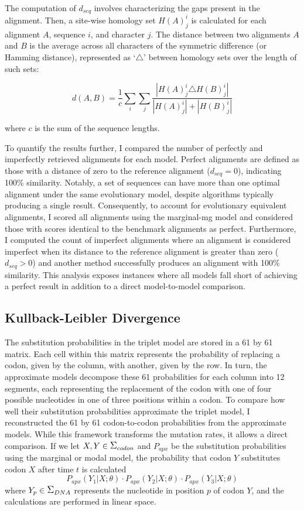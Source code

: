 The computation of $d_{seq}$ involves characterizing the gaps present in the alignment. Then, a site-wise homology set $H(A)^i_j$ is calculated for each alignment $A$, sequence $i$, and character $j$. The distance between two alignments $A$ and $B$ is the average across all characters of the symmetric difference (or Hamming distance), represented as `$\triangle$' between homology sets over the length of such sets:

\begin{equation}
d(A,B) = \frac{1}{c} \sum_i \sum_j \frac{|H(A)^i_j \triangle H(B)^i_j|}{|H(A)^i_j|+|H(B)^i_j|}
\end{equation}

\noindent where $c$ is the sum of the sequence lengths.

To quantify the results further, I compared the number of perfectly and imperfectly retrieved alignments for each model. Perfect alignments are defined as those with a distance of zero to the reference alignment ($d_{seq} = 0$), indicating 100\% similarity. Notably, a set of sequences can have more than one optimal alignment under the same evolutionary model, despite algorithms typically producing a single result. Consequently, to account for evolutionary equivalent alignments, I scored all alignments using the marginal-mg model and considered those with scores identical to the benchmark alignments as perfect. Furthermore, I computed the count of imperfect alignments where an alignment is considered imperfect when its distance to the reference alignment is greater than zero ($d_{seq} > 0$) and another method successfully produces an alignment with 100\% similarity. This analysis exposes instances where all models fall short of achieving a perfect result in addition to a direct model-to-model comparison.

\subsection{Kullback-Leibler Divergence}

The substitution probabilities in the triplet model are stored in a 61 by 61 matrix. Each cell within this matrix represents the probability of replacing a codon, given by the column, with another, given by the row. In turn, the approximate models decompose these 61 probabilities for each column into 12 segments, each representing the replacement of the codon with one of four possible nucleotides in one of three positions within a codon. To compare how well their substitution probabilities approximate the triplet model, I reconstructed the 61 by 61 codon-to-codon probabilities from the approximate models. While this framework transforms the mutation rates, it allows a direct comparison. If we let $X, Y \in \grande{\Sigma}_{codon}$ and $P_{apx}$ be the substitution probabilities using the marginal or modal model, the probability that codon $Y$ substitutes codon $X$ after time $t$ is calculated
%
\[ P_{apx}(Y_1 | X; \theta) \cdot P_{apx}(Y_2 | X; \theta) \cdot P_{apx}(Y_3 | X; \theta) \]
%
where $Y_p \in \grande{\Sigma}_{DNA}$ represents the nucleotide in position $p$ of codon $Y$, and the calculations are performed in linear space.

